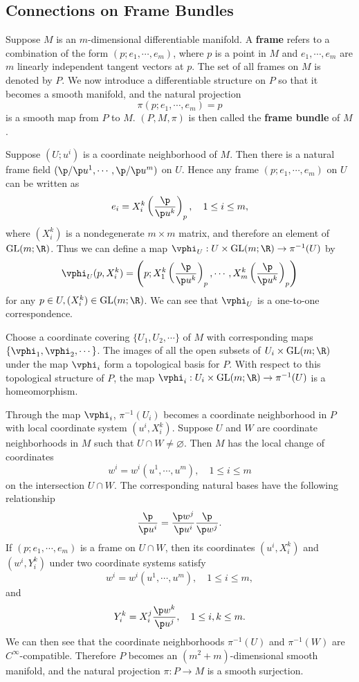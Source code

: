 \documentclass[11pt]{article}
\begin{document}
\subsection{Connections on Frame Bundles}

Suppose $M$ is an $m$-dimensional differentiable manifold. A \textbf{frame} refers to a combination of the form $(p;e_1, \cdots, e_m)$, where $p$ is a point in $M$ and $e_1, \cdots, e_m$ are $m$ linearly independent tangent vectors at $p$. The set of all frames on $M$ is denoted by $P$. We now introduce a differentiable structure on $P$ so that it becomes a smooth manifold, and the natural projection $$\pi(p; e_1, \cdots, e_m) = p$$ is a smooth map from $P$ to $M$. $(P, M, \pi)$ is then called the \textbf{frame bundle} of $M$. 

Suppose $(U; u^i)$ is a coordinate neighborhood of $M$. Then there is a natural frame field $(\p/\p u^1, \cdots, \p/\p u^m)$ on $U$. Hence any frame $(p; e_1, \cdots, e_m)$ on $U$ can be written as $$e_i = X^k_i\left(\frac{\p}{\p u^k}\right)_p, \quad 1 \le i \le m,$$ where $(X^k_i)$ is a nondegenerate $m \times m$ matrix, and therefore an element of $\GL(m;\R)$. Thus we can define a map $\vphi_U : U \times \GL(m; \R) \rightarrow \pi^{-1}(U)$ by $$\vphi_U(p, X^k_i) = \left(p; X^k_1\left(\frac{\p}{\p u^k}\right)_p, \cdots, X^k_m\left(\frac{\p}{\p u^k}\right)_p\right)$$ for any $p \in U, (X^k_i) \in \GL(m; \R)$. We can see that $\vphi_U$ is a one-to-one correspondence. 

Choose a coordinate covering $\{U_1, U_2, \cdots\}$ of $M$ with corresponding maps $\{\vphi_1, \vphi_2, \cdots\}$. The images of all the open subsets of $U_i \times \GL(m; \R)$ under the map $\vphi_i$ form a topological basis for $P$. With respect to this topological structure of $P$, the map $\vphi_i : U_i \times \GL(m; \R) \rightarrow \pi^{-1}(U)$ is a homeomorphism. 

Through the map $\vphi_i$, $\pi^{-1}(U_i)$ becomes a coordinate neighborhood in $P$ with local coordinate system $(u^i, X^k_i)$. Suppose $U$ and $W$ are coordinate neighborhoods in $M$ such that $U \cap W \neq \varnothing$. Then $M$ has the local change of coordinates $$w^i = w^i(u^1, \cdots, u^m), \quad 1 \le i \le m$$ on the intersection $U \cap W$. The corresponding natural bases have the following relationship $$\frac{\p}{\p u^i} = \frac{\p w^j}{\p u^i}\frac{\p}{\p w^j}.$$ If $(p; e_1, \cdots, e_m)$ is a frame on $U \cap W$, then its coordinates $(u^i, X^k_i)$ and $(w^i, Y^k_i)$ under two coordinate systems satisfy $$ w^i = w^i(u^1, \cdots, u^m), \quad 1 \le i \le m,$$ and $$Y^k_i = X^j_i\frac{\p w^k}{\p u^j}, \quad 1 \le i, k \le m.$$ We can then see that the coordinate neighborhoods $\pi^{-1}(U)$ and $\pi^{-1}(W)$ are $C^\infty$-compatible. Therefore $P$ becomes an $(m^2 + m)$-dimensional smooth manifold, and the natural projection $\pi : P \rightarrow M$ is a smooth surjection. 
\end{document}
